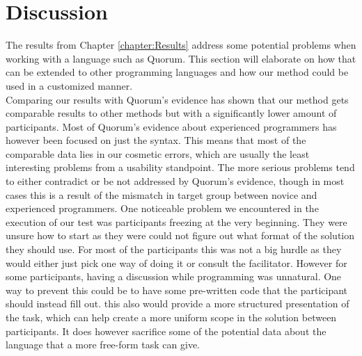 \chapter{Discussion}
The results from Chapter \ref{chapter:Results} address some potential problems when working with a language such as Quorum. This section will elaborate on how that can be extended to other programming languages and how our method could be used in a customized manner.
\\

Comparing our results with Quorum's evidence has shown that our method gets comparable results to other methods but with a significantly lower amount of participants.
Most of Quorum's evidence about experienced programmers has however been focused on just the syntax.
This means that most of the comparable data lies in our cosmetic errors, which are usually the least interesting problems from a usability standpoint.
The more serious problems tend to either contradict or be not addressed by Quorum's evidence, though in most cases this is a result of the mismatch in target group between novice and experienced programmers.
One noticeable problem we encountered in the execution of our test was participants freezing at the very beginning.
They were unsure how to start as they were could not figure out what format of the solution they should use.
For most of the participants this was not a big hurdle as they would either just pick one way of doing it or consult the facilitator.
However for some participants, having a discussion while programming was unnatural.
One way to prevent this could be to have some pre-written code that the participant should instead fill out.
this also would provide a more structured presentation of the task, which can help create a more uniform scope in the solution between participants.
It does however sacrifice some of the potential data about the language that a more free-form task can give.

